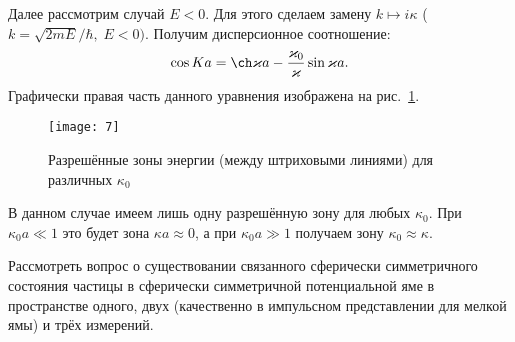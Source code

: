 \documentclass[a4paper]{article}
\begin{document}
\begin{sol}
Далее рассмотрим случай $E<0$. Для этого сделаем замену
$k \mapsto i \kappa$ ($k= \sqrt{2m E} /\hbar,\; E<0)$. Получим дисперсионное соотношение:
\[
\cos Ka = \ch \kappa a- \frac{\kappa_0}{\kappa } \sin \kappa a
.\] 
Графически правая часть данного уравнения изображена на рис.~\ref{fig:7}.
\begin{figure}[htpb]
	\centering
	\texttt{[image: 7]}
	\caption{Разрешённые зоны энергии (между штриховыми
	линиями) для различных $\kappa_0$} 
	\label{fig:7}
\end{figure}
В данном случае имеем лишь одну разрешённую зону для любых $\kappa_0$. При $\kappa_0 a\ll 1$ это будет зона  $\kappa a \approx 0$,
а при $\kappa_0 a \gg 1$ получаем
зону $\kappa_0 \approx \kappa$.
\end{sol}
\begin{problem}
	Рассмотреть вопрос о существовании связанного сферически симметричного состояния частицы в сферически симметричной потенциальной яме в пространстве одного, двух (качественно в импульсном представлении для мелкой ямы) и трёх измерений.
\end{problem}
\end{document}

